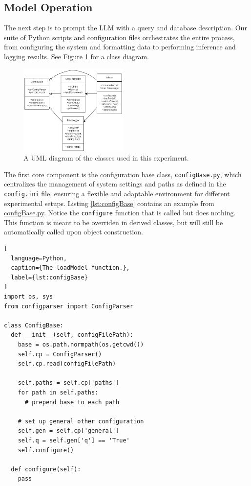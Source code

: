 \subsection{Model Operation}
The next step is to prompt the LLM with a query and database description. Our suite of Python scripts and configuration files orchestrates the entire process, from configuring the system and formatting data to performing inference and logging results. See Figure \ref{fig:classDiagram} for a class diagram.
\begin{figure}[htb]
  \centering
  \includegraphics[width=0.48\textwidth]{figures/classDiagram.png}
  \caption{A UML diagram of the classes used in this experiment.}
  \label{fig:classDiagram}
\end{figure}

The first core component is the configuration base class, \lstinline{configBase.py}, which centralizes the management of system settings and paths as defined in the \lstinline{config.ini} file, ensuring a flexible and adaptable environment for different experimental setups. Listing \ref{lst:configBase} contains an example from \href{https://github.com/MatousAc/llamaExecPlan/blob/main/src/configBase.py}{configBase.py}. Notice the \lstinline{configure} function that is called but does nothing. This function is meant to be overriden in derived classes, but will still be automatically called upon object construction.

\begin{lstlisting}[
  language=Python,
  caption={The loadModel function.},
  label={lst:configBase}
]
import os, sys
from configparser import ConfigParser

class ConfigBase:
  def __init__(self, configFilePath):
    base = os.path.normpath(os.getcwd())
    self.cp = ConfigParser()
    self.cp.read(configFilePath)

    self.paths = self.cp['paths']
    for path in self.paths:
      # prepend base to each path
    
    # set up general other configuration
    self.gen = self.cp['general']
    self.q = self.gen['q'] == 'True'
    self.configure()
  
  def configure(self):
    pass
\end{lstlisting}

